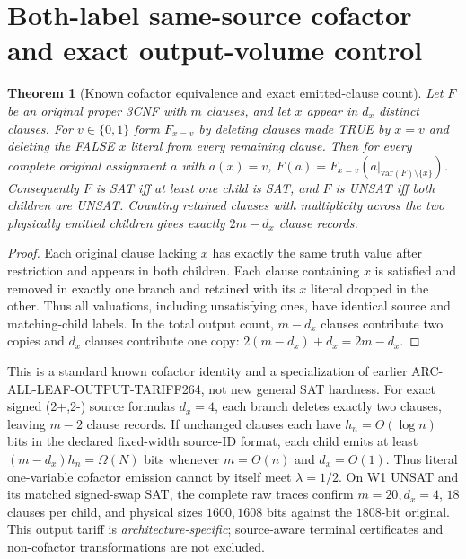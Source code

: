 \documentclass[11pt]{article}
\newtheorem{theorem}{Theorem}
\begin{document}
\section{Both-label same-source cofactor and exact output-volume control}
\begin{theorem}[Known cofactor equivalence and exact emitted-clause count]
Let $F$ be an original proper 3CNF with $m$ clauses, and let $x$
appear in $d_x$ distinct clauses. For $v\in\{0,1\}$ form
$F_{x=v}$ by deleting clauses made TRUE by $x=v$ and deleting
the FALSE $x$ literal from every remaining clause. Then for
\emph{every complete original assignment} $a$ with $a(x)=v$,
$F(a)=F_{x=v}(a|_{\mathrm{var}(F)\setminus\{x\}})$.
Consequently $F$ is SAT iff at least one child is SAT, and $F$
is UNSAT iff both children are UNSAT. Counting retained clauses
with multiplicity across the \emph{two physically emitted} children
gives exactly $2m-d_x$ clause records.
\end{theorem}
\begin{proof}
Each original clause lacking $x$ has exactly the same truth value
after restriction and appears in both children. Each clause
containing $x$ is satisfied and removed in exactly one branch
and retained with its $x$ literal dropped in the other.
Thus all valuations, including unsatisfying ones, have identical
source and matching-child labels. In the total output count,
$m-d_x$ clauses contribute two copies and $d_x$ clauses contribute
one copy: $2(m-d_x)+d_x=2m-d_x$.
\end{proof}
This is a standard known cofactor identity and a specialization
of earlier ARC-ALL-LEAF-OUTPUT-TARIFF264, not new general SAT hardness.
For exact signed (2+,2-) source formulas $d_x=4$, each branch
deletes exactly two clauses, leaving $m-2$ clause records.
If unchanged clauses each have $h_n=\Theta(\log n)$ bits in the
declared fixed-width source-ID format, each child emits at least
$(m-d_x)h_n=\Omega(N)$ bits whenever $m=\Theta(n)$ and $d_x=O(1)$.
Thus literal one-variable cofactor emission cannot by itself
meet $\lambda=1/2$. On W1 UNSAT and its matched signed-swap SAT,
the complete raw traces confirm $m=20,d_x=4$, $18$ clauses
per child, and physical sizes $1600,1608$ bits against the
$1808$-bit original. This output tariff is \emph{architecture-specific};
source-aware terminal certificates and non-cofactor transformations
are not excluded.
\end{document}
